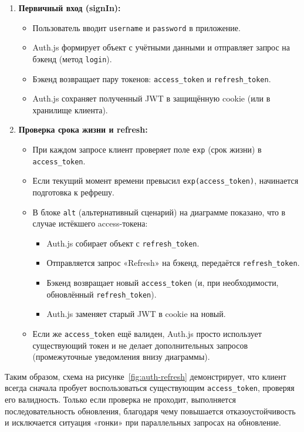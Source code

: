\begin{enumerate}
    \item \textbf{Первичный вход (sign\-In):} 
    \begin{itemize}
        \item Пользователь вводит \texttt{username} и \texttt{password} в приложение.
        \item Auth.js формирует объект с учётными данными и отправляет запрос на бэкенд (метод \texttt{login}).
        \item Бэкенд возвращает пару токенов: \texttt{access\_token} и \texttt{refresh\_token}.
        \item Auth.js сохраняет полученный JWT в защищённую cookie (или в хранилище клиента).
    \end{itemize}
    \item \textbf{Проверка срока жизни и refresh:}
    \begin{itemize}
        \item При каждом запросе клиент проверяет поле \texttt{exp} (срок жизни) в \texttt{access\_token}.
        \item Если текущий момент времени превысил \texttt{exp(access\_token)}, начинается подготовка к рефрешу.
        \item В блоке \texttt{alt} (альтернативный сценарий) на диаграмме показано, что в случае истёкшего access-токена:
        \begin{itemize}
            \item Auth.js собирает объект с \texttt{refresh\_token}.
            \item Отправляется запрос «Refresh» на бэкенд, передаётся \texttt{refresh\_token}.
            \item Бэкенд возвращает новый \texttt{access\_token} (и, при необходимости, обновлённый \texttt{refresh\_token}).
            \item Auth.js заменяет старый JWT в cookie на новый.
        \end{itemize}
        \item Если же \texttt{access\_token} ещё валиден, Auth.js просто использует существующий токен и не делает дополнительных запросов (промежуточные уведомления внизу диаграммы).
    \end{itemize}
\end{enumerate}

Таким образом, схема на рисунке~\ref{fig:auth-refresh} демонстрирует, что клиент всегда сначала пробует воспользоваться существующим \texttt{access\_token}, проверяя его валидность. Только если проверка не проходит, выполняется последовательность обновления, благодаря чему повышается отказоустойчивость и исключается ситуация «гонки» при параллельных запросах на обновление.

